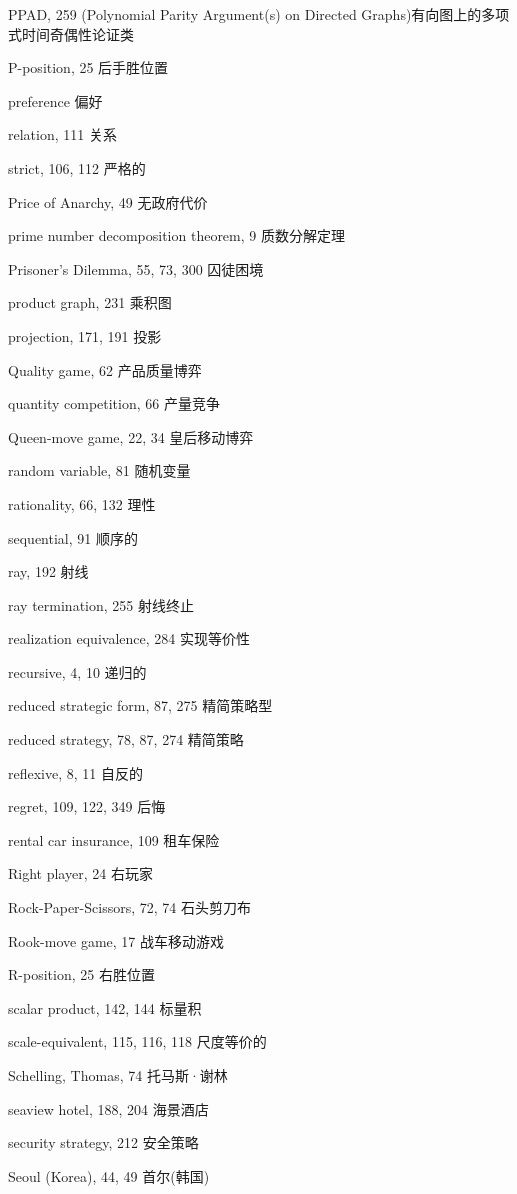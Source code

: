 PPAD, 259 (Polynomial Parity Argument(s) on Directed Graphs)有向图上的多项式时间奇偶性论证类

P-position, 25 后手胜位置


preference 偏好


relation, 111 关系

strict, 106, 112 严格的

Price of Anarchy, 49 无政府代价


prime number decomposition theorem, 9 质数分解定理


Prisoner's Dilemma, 55, 73, 300 囚徒困境


product graph, 231 {\color{blue} 乘积图}


projection, 171, 191 投影


Quality game, 62 产品质量博弈


quantity competition, 66 产量竞争


Queen-move game, 22, 34 皇后移动博弈


random variable, 81 随机变量


rationality, 66, 132 理性

sequential, 91 顺序的


ray, 192 射线


ray termination, 255 射线终止

realization equivalence, 284 实现等价性


recursive, 4, 10 递归的


reduced strategic form, 87, 275 精简策略型


reduced strategy, 78, 87, 274 精简策略


reflexive, 8, 11 自反的


regret, 109, 122, 349 后悔


rental car insurance, 109 租车保险


Right player, 24 右玩家


Rock-Paper-Scissors, 72, 74 石头剪刀布


Rook-move game, 17 战车移动游戏


R-position, 25 右胜位置


scalar product, 142, 144 标量积


scale-equivalent, 115, 116, 118 尺度等价的


Schelling, Thomas, 74 托马斯·谢林


seaview hotel, 188, 204 {\color{blue}海景酒店}


security strategy, 212 安全策略


Seoul (Korea), 44, 49 首尔(韩国)


